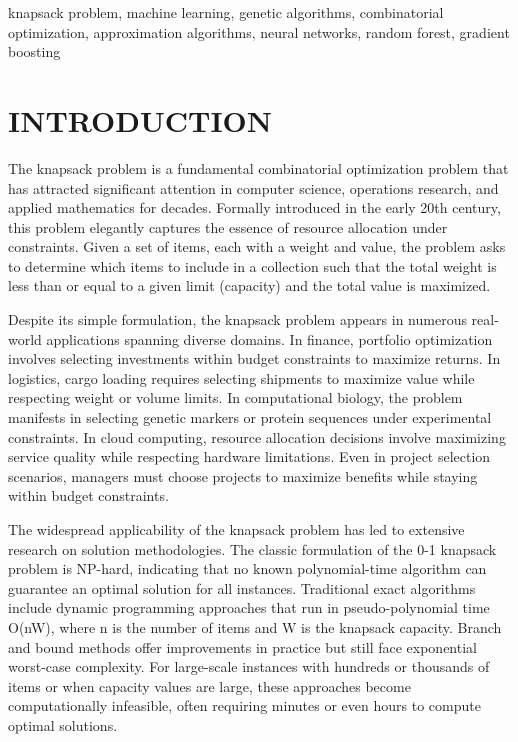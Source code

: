 \documentclass[conference, a4paper]{IEEEtran}
\begin{document}
\begin{IEEEkeywords}
knapsack problem, machine learning, genetic algorithms, combinatorial optimization, approximation algorithms, neural networks, random forest, gradient boosting
\end{IEEEkeywords}

\section{INTRODUCTION}

The knapsack problem is a fundamental combinatorial optimization problem that has attracted significant attention in computer science, operations research, and applied mathematics for decades. Formally introduced in the early 20th century, this problem elegantly captures the essence of resource allocation under constraints. Given a set of items, each with a weight and value, the problem asks to determine which items to include in a collection such that the total weight is less than or equal to a given limit (capacity) and the total value is maximized.

Despite its simple formulation, the knapsack problem appears in numerous real-world applications spanning diverse domains. In finance, portfolio optimization involves selecting investments within budget constraints to maximize returns. In logistics, cargo loading requires selecting shipments to maximize value while respecting weight or volume limits. In computational biology, the problem manifests in selecting genetic markers or protein sequences under experimental constraints. In cloud computing, resource allocation decisions involve maximizing service quality while respecting hardware limitations. Even in project selection scenarios, managers must choose projects to maximize benefits while staying within budget constraints.

The widespread applicability of the knapsack problem has led to extensive research on solution methodologies. The classic formulation of the 0-1 knapsack problem is NP-hard, indicating that no known polynomial-time algorithm can guarantee an optimal solution for all instances. Traditional exact algorithms include dynamic programming approaches that run in pseudo-polynomial time O(nW), where n is the number of items and W is the knapsack capacity. Branch and bound methods offer improvements in practice but still face exponential worst-case complexity. For large-scale instances with hundreds or thousands of items or when capacity values are large, these approaches become computationally infeasible, often requiring minutes or even hours to compute optimal solutions.
\end{document}
